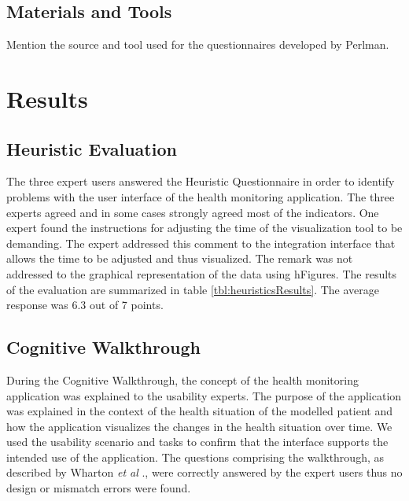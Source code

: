 \documentclass[twocolumn]{bmcart}%
\begin{document}
\subsection*{Materials and Tools} 

Mention the source and tool used for the questionnaires developed by Perlman.


\section*{Results}

\subsection*{Heuristic Evaluation}

The three expert users answered the Heuristic Questionnaire in order to identify problems with the user interface of the health monitoring application. The three experts agreed and in some cases strongly agreed most of the indicators. One expert found the instructions for adjusting the time of the visualization tool to be demanding. The expert addressed this comment to the integration interface that allows the time to be adjusted and thus visualized. The remark was not addressed to the graphical representation of the data using hFigures. The results of the evaluation are summarized in table \ref{tbl:heuristicsResults}. The average response was 6.3 out of 7 points.


\subsection*{Cognitive Walkthrough}


During the Cognitive Walkthrough, the concept of the health monitoring application was explained to the usability experts. The purpose of the application was explained in the context of the health situation of the modelled patient and how the application visualizes the changes in the health situation over time. We used the usability scenario and tasks to confirm that the interface supports the intended use of the application. The questions comprising the walkthrough, as described by Wharton \textit{et al} \cite{wharton1994cognitive}., were correctly answered by the expert users thus no design or mismatch errors were found.
\end{document}
